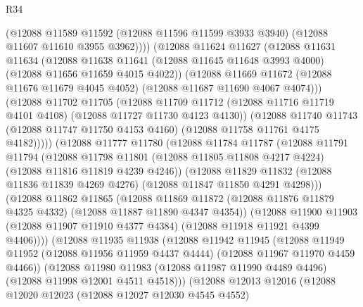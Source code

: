 \begin{lexlean}{R34}
\begin{coremodule}
              (@12088
                @11589
                @11592
                (@12088 @11596 @11599 @3933 @3940)
                (@12088 @11607 @11610 @3955 @3962))))
          (@12088
            @11624
            @11627
            (@12088
              @11631
              @11634
              (@12088
                @11638
                @11641
                (@12088 @11645 @11648 @3993 @4000)
                (@12088 @11656 @11659 @4015 @4022))
              (@12088
                @11669
                @11672
                (@12088 @11676 @11679 @4045 @4052)
                (@12088 @11687 @11690 @4067 @4074)))
            (@12088
              @11702
              @11705
              (@12088
                @11709
                @11712
                (@12088 @11716 @11719 @4101 @4108)
                (@12088 @11727 @11730 @4123 @4130))
              (@12088
                @11740
                @11743
                (@12088 @11747 @11750 @4153 @4160)
                (@12088 @11758 @11761 @4175 @4182)))))
        (@12088
          @11777
          @11780
          (@12088
            @11784
            @11787
            (@12088
              @11791
              @11794
              (@12088
                @11798
                @11801
                (@12088 @11805 @11808 @4217 @4224)
                (@12088 @11816 @11819 @4239 @4246))
              (@12088
                @11829
                @11832
                (@12088 @11836 @11839 @4269 @4276)
                (@12088 @11847 @11850 @4291 @4298)))
            (@12088
              @11862
              @11865
              (@12088
                @11869
                @11872
                (@12088 @11876 @11879 @4325 @4332)
                (@12088 @11887 @11890 @4347 @4354))
              (@12088
                @11900
                @11903
                (@12088 @11907 @11910 @4377 @4384)
                (@12088 @11918 @11921 @4399 @4406))))
          (@12088
            @11935
            @11938
            (@12088
              @11942
              @11945
              (@12088
                @11949
                @11952
                (@12088 @11956 @11959 @4437 @4444)
                (@12088 @11967 @11970 @4459 @4466))
              (@12088
                @11980
                @11983
                (@12088 @11987 @11990 @4489 @4496)
                (@12088 @11998 @12001 @4511 @4518)))
            (@12088
              @12013
              @12016
              (@12088
                @12020
                @12023
                (@12088 @12027 @12030 @4545 @4552)

\end{coremodule}
\end{lexlean}

